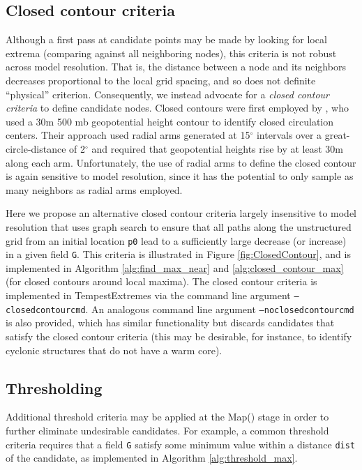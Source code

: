 \documentclass[gmdd, hvmath, online]{copernicus_discussions}
\begin{document}
\subsection{Closed contour criteria} \label{sec:ClosedContour}

Although a first pass at candidate points may be made by looking for local extrema (comparing against all neighboring nodes), this criteria is not robust across model resolution.  That is, the distance between a node and its neighbors decreases proportional to the local grid spacing, and so does not definite ``physical'' criterion.  Consequently, we instead advocate for a \textit{closed contour criteria} to define candidate nodes.  Closed contours were first employed by \cite{bell198915}, who used a 30m 500 mb geopotential height contour to identify closed circulation centers.  Their approach used radial arms generated at 15$^\circ$ intervals over a great-circle-distance of 2$^\circ$ and required that geopotential heights rise by at least 30m along each arm.  Unfortunately, the use of radial arms to define the closed contour is again sensitive to model resolution, since it has the potential to only sample as many neighbors as radial arms employed.

Here we propose an alternative closed contour criteria largely insensitive to model resolution that uses graph search to ensure that all paths along the unstructured grid from an initial location \texttt{p0} lead to a sufficiently large decrease (or increase) in a given field \texttt{G}.  This criteria is illustrated in Figure \ref{fig:ClosedContour}, and is implemented in Algorithm \ref{alg:find_max_near} and \ref{alg:closed_contour_max} (for closed contours around local maxima).  The closed contour criteria is implemented in TempestExtremes via the command line argument \texttt{--closedcontourcmd}.  An analogous command line argument \texttt{--noclosedcontourcmd} is also provided, which has similar functionality but discards candidates that satisfy the closed contour criteria (this may be desirable, for instance, to identify cyclonic structures that do not have a warm core).

\subsection{Thresholding}

Additional threshold criteria may be applied at the Map() stage in order to further eliminate undesirable candidates.  For example, a common threshold criteria requires that a field \texttt{G} satisfy some minimum value within a distance \texttt{dist} of the candidate, as implemented in Algorithm \ref{alg:threshold_max}.
\end{document}

